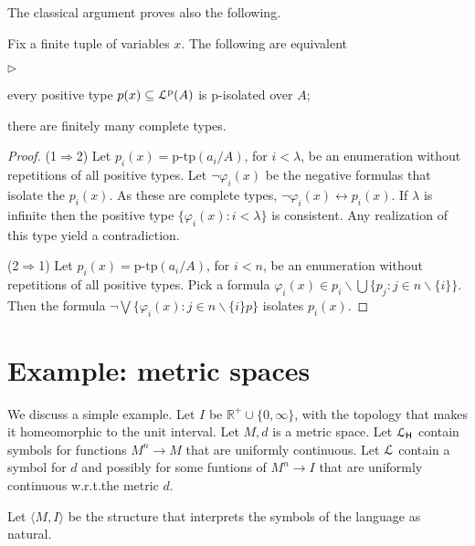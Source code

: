 \documentclass[10pt,oneside]{amsproc}
\newcommand{\mylabel}[1]{{#1}\hfill}
\renewenvironment{itemize}
  {\begin{list}{$\triangleright$}{%
  \setlength{\parskip}{0mm}
  \setlength{\topsep}{.4\baselineskip}
  \setlength{\rightmargin}{0mm}
  \setlength{\listparindent}{0mm}
  \setlength{\itemindent}{0mm}
  \setlength{\labelwidth}{3ex}
  \setlength{\itemsep}{.2\baselineskip}
  \setlength{\parsep}{.2\baselineskip}
  \setlength{\partopsep}{0mm}
  \setlength{\labelsep}{1ex}
  \setlength{\leftmargin}{\labelwidth+\labelsep}
  \let\makelabel\mylabel}}{%
\end{list}}
\begin{document}
{The classical argument proves also the following.

\begin{proposition}
  Fix a finite tuple of variables $x$.
  The following are equivalent
  \begin{itemize}
    \item[1.] every positive type $p(x)\subseteq{\EuScript L}^{\rm p}(A)$ is p-isolated over $A$;
    \item[2.] there are finitely many complete types.
  \end{itemize}
\end{proposition}

\begin{proof}
  (1$\Rightarrow$2) 
  Let $p_i(x)=\mbox{p-tp}(a_i/A)$, for $i<\lambda$, be an enumeration without repetitions of all positive types.
  Let $\neg\varphi_i(x)$ be the negative formulas that isolate the $p_i(x)$.
  As these are complete types, $\neg\varphi_i(x)\leftrightarrow p_i(x)$.
  If $\lambda$ is infinite then the positive type $\{\varphi_i(x):i<\lambda\}$ is consistent.
  Any realization of this type yield a contradiction.

  (2$\Rightarrow$1)
  Let $p_i(x)=\mbox{p-tp}(a_i/A)$, for $i<n$, be an enumeration without repetitions of all positive types.
  Pick a formula $\varphi_i(x)\in p_i\smallsetminus\bigcup\big\{ p_j : j\in n\smallsetminus\{i\}\big\}$.
  Then the formula $\neg\bigvee\big\{\varphi_i(x):j\in n\smallsetminus\{i\}p\big\}$ isolates $p_i(x)$.
\end{proof}



\section{Example: metric spaces}

We discuss a simple example.
Let $I$ be $\mathds{R}^+\cup\{0,\infty\}$, with the topology that makes it homeomorphic to the unit interval.
Let $M,d$ is a metric space.
Let ${\EuScript L}_{\sf H}$ contain symbols for functions $M^n\to M$ that are uniformly continuous.
Let ${\EuScript L}$ contain a symbol for $d$ and possibly for some funtions of $M^n\to I$ that are uniformly continuous w.r.t.\@ the metric $d$.

Let $\langle M,I\rangle$ be the structure that interprets the symbols of the language as natural.

}
\end{document}
